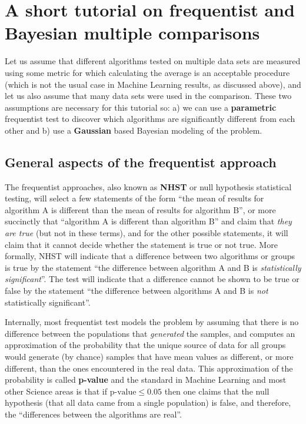 \documentclass[twoside,11pt,preprint]{article}
\begin{document}
\hypertarget{a-short-tutorial-on-frequentist-and-bayesian-multiple-comparisons}{%
\section{\texorpdfstring{A short tutorial on frequentist and Bayesian multiple comparisons \label{sec:tut}}{A short tutorial on frequentist and Bayesian multiple comparisons }}\label{a-short-tutorial-on-frequentist-and-bayesian-multiple-comparisons}}

Let us assume that different algorithms tested on multiple data sets
are measured using some metric for which calculating the average is an
acceptable procedure (which is not the usual case in Machine Learning
results, as discussed above), and let us also assume that many data sets
were used in the comparison. These two assumptions are necessary for
this tutorial so: a) we can use a \textbf{parametric} frequentist test to
discover which algorithms are significantly different from each other
and b) use a \textbf{Gaussian} based Bayesian modeling of the problem.

\hypertarget{general-aspects-of-the-frequentist-approach}{%
\subsection{\texorpdfstring{General aspects of the frequentist approach \label{sec:tut1}}{General aspects of the frequentist approach }}\label{general-aspects-of-the-frequentist-approach}}

The frequentist approaches, also known as \textbf{NHST} or null hypothesis
statistical testing, will select a few statements of the form ``the
mean of results for algorithm A is different than the mean of results
for algorithm B'', or more succinctly that ``algorithm A is different
than algorithm B'' and claim that \emph{they are true} (but not in these
terms), and for the other possible statements, it will claim that it
cannot decide whether the statement is true or not true. More
formally, NHST will indicate that a difference between two
algorithms or groups is true by the statement ``the difference between algorithm
A and B is \emph{statistically significant}''. The test will indicate that a
difference cannot be shown to be true or false by the statement ``the
difference between algorithms A and B is \emph{not} statistically
significant''.

Internally, most frequentist test models the problem by assuming that
there is no difference between the populations that \emph{generated} the
samples, and computes an approximation of the probability that the
unique source of data for all groups would generate (by chance)
samples that have mean values as different, or more different, than the ones
encountered in the real data. This approximation of the probability
is called \textbf{p-value} and the standard in Machine Learning and most other Science areas is
that if \(\mbox{p-value} \le 0.05\) then one claims that
the null hypothesis (that all data came from a single population) is
false, and therefore, the ``differences between the algorithms are real''.
\end{document}
